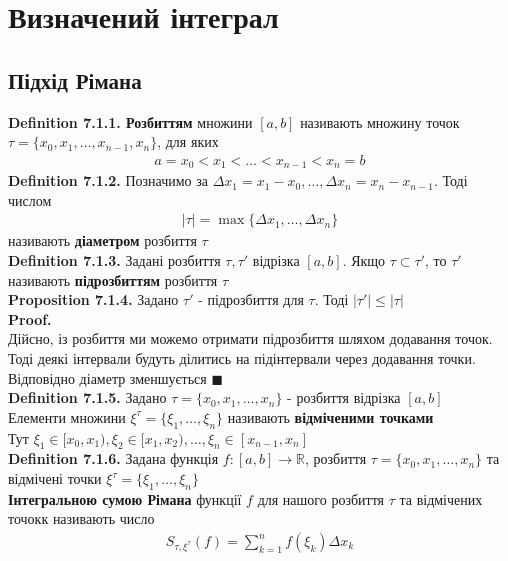 \documentclass[a4paper, 14pt]{extarticle}
\def\bigline{\vspace{5mm}\\}
\def\defin#1{\textbf{Definition {#1}}}
\def\prp#1{\textbf{Proposition {#1}}}
\def\proof{\textbf{Proof.}\\}
\def\bigline{\vspace{5mm}\\}
\def\qed{$\blacksquare$}
\begin{document}
\section{Визначений інтеграл}
\subsection{Підхід Рімана}
\defin{7.1.1. Розбиттям} множини $[a,b]$ називають множину точок $\tau = \{x_0,x_1,\dots,x_{n-1},x_n\}$, для яких
\begin{align*}
a = x_0 < x_1 < \dots < x_{n-1} < x_{n} = b
\end{align*}
\defin{7.1.2.} Позначимо за $\Delta x_1 = x_1 - x_0, \dots, \Delta x_n = x_{n} - x_{n-1}$. Тоді числом
\begin{align*}
|\tau| = \max\{\Delta x_1,\dots, \Delta x_n\}
\end{align*}
називають \textbf{діаметром} розбиття $\tau$
\bigline
\defin{7.1.3.} Задані розбиття $\tau, \tau'$ відрізка $[a,b]$. Якщо $\tau \subset \tau'$, то $\tau'$ називають \textbf{підрозбиттям} розбиття $\tau$
\bigline
\prp{7.1.4.} Задано $\tau'$ - підрозбиття для $\tau$. Тоді $|\tau'| \leq |\tau|$\\
\proof
Дійсно, із розбиття ми можемо отримати підрозбиття шляхом додавання точок. Тоді деякі інтервали будуть ділитись на підінтервали через додавання точки. Відповідно діаметр зменшується  \qed
\bigline
\defin{7.1.5.} Задано $\tau = \{x_0,x_1,\dots,x_n\}$ - розбиття відрізка $[a,b]$\\
Елементи множини $\xi^{\tau} = \{\xi_1, \dots, \xi_n \}$ називають \textbf{відміченими точками}\\
Тут $\xi_1 \in [x_0,x_1), \xi_2 \in [x_1,x_2), \dots, \xi_n \in [x_{n-1}, x_n]$
\bigline
\defin{7.1.6.} Задана функція $f: [a,b] \to \mathbb{R}$, розбиття $\tau = \{x_0,x_1,\dots,x_n\}$ та відмічені точки $\xi^{\tau} = \{\xi_1, \dots, \xi_n \}$\\
\textbf{Інтегральною сумою Рімана} функції $f$ для нашого розбиття $\tau$ та відмічених точокк називають число
\begin{align*}
S_{\tau, \xi^{\tau}}(f) = \sum_{k=1}^n f(\xi_k) \Delta x_k
\end{align*}
\end{document}
